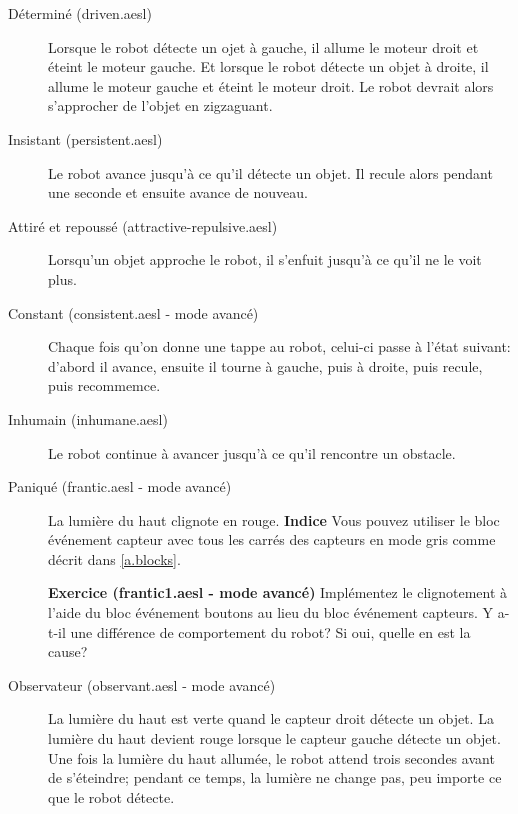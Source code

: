 \begin{description}
\item[Déterminé (driven.aesl)]
Lorsque le robot détecte un ojet à gauche, il allume le moteur droit et éteint le moteur gauche.
Et lorsque le robot détecte un objet à droite, il allume le moteur gauche et éteint le moteur droit.
Le robot devrait alors s'approcher de l'objet en zigzaguant.

\item[Insistant (persistent.aesl)]
Le robot avance jusqu'à ce qu'il détecte un objet.
Il recule alors pendant une seconde et ensuite avance de nouveau.

\item[Attiré et repoussé (attractive-repulsive.aesl)]
Lorsqu'un objet approche le robot, il s'enfuit jusqu'à ce qu'il ne le voit plus.

\item[Constant (consistent.aesl - mode avancé)]
Chaque fois qu'on donne une tappe au robot, celui-ci passe à l'état suivant:
d'abord il avance, ensuite il tourne à gauche, puis à droite, puis recule, puis recommemce.

\item[Inhumain (inhumane.aesl)]
Le robot continue à avancer jusqu'à ce qu'il rencontre un obstacle.

\item[Paniqué (frantic.aesl - mode avancé)]
La lumière du haut clignote en rouge.
\textbf{Indice} Vous pouvez utiliser le bloc événement capteur avec tous les carrés des capteurs en mode gris comme décrit dans \cref{a.blocks}.

\textbf{Exercice (frantic1.aesl - mode avancé)}
Implémentez le clignotement à l'aide du bloc événement boutons au lieu du bloc événement capteurs.
Y a-t-il une différence de comportement du robot? Si oui, quelle en est la cause?

\item[Observateur (observant.aesl - mode avancé)]
La lumière du haut est verte quand le capteur droit détecte un objet.
La lumière du haut devient rouge lorsque le capteur gauche détecte un objet.
Une fois la lumière du haut allumée, le robot attend trois secondes avant de s'éteindre;
pendant ce temps, la lumière ne change pas, peu importe ce que le robot détecte.

\end{description}
